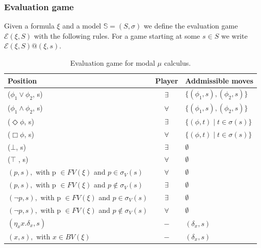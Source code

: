  \subsubsection{Evaluation game}
 \label{sec:evaluation-game}
 Given a formula $\xi$ and a model $\mathbb{S}=(S,\sigma)$ we define the evaluation
 game $\mathcal{E}(\xi,S)$ with the following rules. For a game starting at some
 $s \in S$ we write $\mathcal{E}(\xi,S)@(\xi,s)$.
 \begin{table}[h!]
   \centering
   \begin{tabular}{|l|c|l|}
     \hline Position & Player & Addmissible moves \\\hline
     ($\phi_{1} \lor \phi_{2}$, s)                          &  $\exists$ &  $\{(\phi_{1}, s), (\phi_{2}, s)\}   $\\
     ($\phi_{1} \land \phi_{2}$, s)                          &  $\forall$ &  $\{(\phi_{1}, s), (\phi_{2}, s)\}    $\\
     ($\Diamond \phi$, s)                              &  $\exists$ & $\{(\phi, t) \mid t \in \sigma(s)\} $\\
     ($\Box \phi$, s)                              &  $\forall$ & $\{(\phi, t) \mid t \in \sigma(s)\} $\\\hline
     ($\bot$, s)                                 &  $\exists$ &  $\emptyset $                   \\
     ($\top$ , s)                                 &  $\forall$ &  $\emptyset $                   \\\hline
     $(p, s),$ with p $\in FV (\xi)$ and  $p \in \sigma_{V}(s)$  &  $\forall$ &  $\emptyset $                   \\
     $(p, s),$ with p $\in FV (\xi)$ and $p \notin \sigma_{V}(s)$  &  $\exists$ &  $\emptyset $                   \\
     $(\neg p, s),$ with p $\in FV (\xi)$ and $p \in \sigma_{V}(s)$ &  $\exists$ &  $\emptyset $                   \\
     $(\neg p, s),$ with p $\in FV (\xi)$ and $p \notin \sigma_{V}(s)$ &  $\forall$ &  $\emptyset $                   \\\hline
     $(\eta_{x}x.\delta_{x} ,s)$                          &  $-$ &  ${(\delta_{x}, s)}$           \\
     $(x, s),$ with $x \in BV(\xi)$                &  $-$ &  ${(\delta_{x}, s)}$
     \\
     \hline
   \end{tabular}
   \caption{Evaluation game for modal $\mu$ calculus.}
   \label{not:evalgame}
 \end{table}

